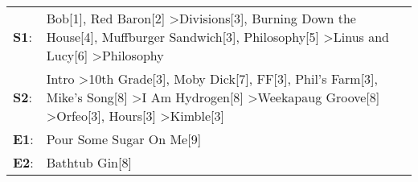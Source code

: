 \begin{supertabular}{p{0.03\textwidth}p{0.92\textwidth}}
 \textbf{S1}:  &                                                                                                                       Bob[1]\textsuperscript{}, \enspace Red Baron[2]\textsuperscript{} \textgreater \enspace Divisions[3]\textsuperscript{}, \enspace Burning Down the House[4]\textsuperscript{}, \enspace Muffburger Sandwich[3]\textsuperscript{}, \enspace Philosophy[5]\textsuperscript{} \textgreater \enspace Linus and Lucy[6]\textsuperscript{} \textgreater \enspace Philosophy\textsuperscript{}  \enspace  \\
 \textbf{S2}:  &  Intro\textsuperscript{} \textgreater \enspace 10th Grade[3]\textsuperscript{}, \enspace Moby Dick[7]\textsuperscript{}, \enspace FF[3]\textsuperscript{}, \enspace Phil's Farm[3]\textsuperscript{}, \enspace Mike's Song[8]\textsuperscript{} \textgreater \enspace I Am Hydrogen[8]\textsuperscript{} \textgreater \enspace Weekapaug Groove[8]\textsuperscript{} \textgreater \enspace Orfeo[3]\textsuperscript{}, \enspace Hours[3]\textsuperscript{} \textgreater \enspace Kimble[3]\textsuperscript{}  \enspace  \\
 \textbf{E1}:  &                                                                                                                                                                                                                                                                                                                                                                                                                                                                   Pour Some Sugar On Me[9]\textsuperscript{}  \enspace  \\
 \textbf{E2}:  &                                                                                                                                                                                                                                                                                                                                                                                                                                                                             Bathtub Gin[8]\textsuperscript{}  \enspace  \\
\end{supertabular}
